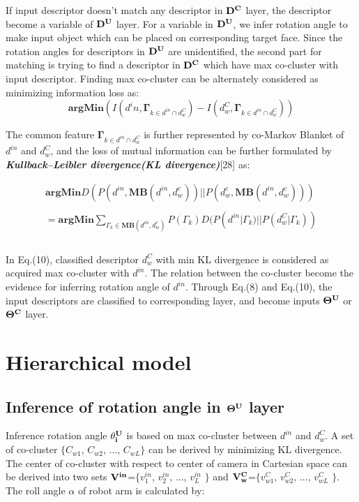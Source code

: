 \documentclass[journal]{IEEEtran}
\begin{document}
If input descriptor doesn't match any descriptor in $\bf{D^C}$ layer, the descriptor become a variable of  $\bf{D^U}$ layer. For a variable in $\bf{D^U}$, we infer rotation angle to make input object which can be placed on corresponding target face. Since the rotation angles for descriptors in $\bf{D^U}$ are unidentified, the second part for matching is trying to find a descriptor in $\bf{D^C}$ which have max co-cluster with input descriptor. Finding max co-cluster can be alternately considered as minimizing information loss as:
\begin{equation}
\mathbf{argMin}(I(d^in , \mathbf{\Gamma}_{k \in d^{in} \cap d^C_w}) - I(d^C_w , \mathbf{\Gamma}_{k \in d^{in} \cap d^C_w}))
\end{equation}

The common feature $\mathbf{\Gamma}_{k \in d^{in} \cap d^C_w}$ is further represented by co-Markov Blanket of $d^{in}$ and $d^C_w$, and the loss of mutual information can be further formulated by \textbf{\textit{Kullback–Leibler divergence(KL divergence)}}[28] as:

\begin{equation}
\begin{array}{ll}
\mathbf{argMin}D(P(d^{in} , \mathbf{MB}(d^{in},d^c_w))||P(d^c_w , \mathbf{MB}(d^{in},d^c_w)))\\\\
= \mathbf{argMin}\sum_{\Gamma_k\in\mathbf{MB}(d^{in},d^c_w)}P(\Gamma_k)D(P(d^{in}|\Gamma_k)||P(d^C_w|\Gamma_k))\\\\
\end{array}
\end{equation}

In Eq.(10), classified descriptor $d^C_w$ with min KL divergence is considered as acquired max co-cluster with $d^{in}$. The relation between the co-cluster become the evidence for inferring rotation angle of $d^{in}$. Through Eq.(8) and Eq.(10), the input descriptors are classified to corresponding layer, and become inputs $\bf{\Theta^{U}}$ or $\bf{\Theta^{C}}$ layer.


\section{Hierarchical model}
\subsection{Inference of rotation angle in $\bf{\Theta^{U}}$ layer}
Inference rotation angle $\bf{\theta^{U}_i}$ is based on max co-cluster between $d^{in}$ and $d^C_w$. A set of co-cluster $\{$$C_{w1}$, $C_{w2}$, ..., $C_{wL}$$\}$ can be derived by minimizing KL divergence. The center of co-cluster with respect to center of camera in Cartesian space can be derived into two sets $\bf{V^{in}}$=$\{$$v^{in}_1$, $v^{in}_2$, ..., $v^{in}_L$ $\}$ and $\bf{V^{C}_w}$=$\{$$v^{C}_{w1}$, $v^{C}_{w2}$, ..., $v^{C}_{wL}$ $\}$. The roll angle $\alpha$ of robot arm is calculated by:
\end{document}
